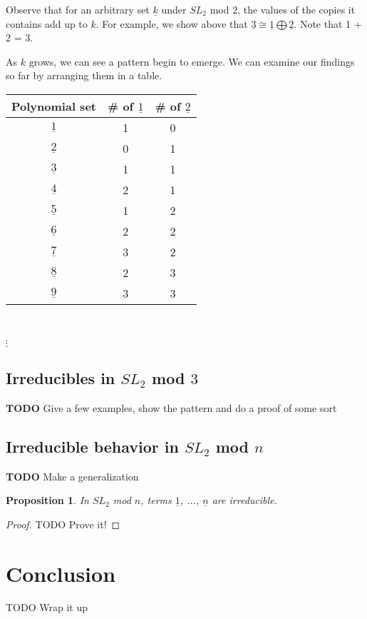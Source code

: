 \documentclass[a4paper,draft]{amsproc}
\theoremstyle{plain}
\newtheorem{prop}{Proposition}[section]
\theoremstyle{definition}
\theoremstyle{remark}
\numberwithin{equation}{section}
\begin{document}
Observe that for an arbitrary set $\underline{k}$ under $SL_{2}$ mod $2$, the values of the copies it contains add up to $k$. For example, we show above that $\underline{3} \cong \underline{1} \bigoplus \underline{2}$. Note that 1 + 2 = 3. 

As $k$ grows, we can see a pattern begin to emerge. We can examine our findings so far by arranging them in a table. 

\begin{table}
    \begin{tabular}{|c|c|c|} 
	\hline
    Polynomial set & \# of $\underline{1}$ & \# of $\underline{2}$ \\ \hline
    $\underline{1}$ & 1 & 0 \\ \hline
    $\underline{2}$ & 0 & 1 \\ \hline
    $\underline{3}$ & 1 & 1 \\ \hline
    $\underline{4}$ & 2 & 1 \\ \hline
    $\underline{5}$ & 1 & 2 \\ \hline
    $\underline{6}$ & 2 & 2 \\ \hline
    $\underline{7}$ & 3 & 2 \\ \hline
    $\underline{8}$ & 2 & 3 \\ \hline
    $\underline{9}$ & 3 & 3 \\ \hline
    \end{tabular} \\
\begin{centering}$\vdots$\end{centering}
\end{table}

\subsection{Irreducibles in $SL_{2}$ mod $3$}
\textbf{TODO} Give a few examples, show the pattern and do a proof of some sort

\subsection{Irreducible behavior in $SL_{2}$ mod $n$}
\textbf{TODO} Make a generalization
\begin{prop}
 In $SL_{2}$ mod $n$, terms $\underline{1}$, ..., $\underline{n}$ are irreducible. 
\end{prop}
\begin{proof}
{TODO} Prove it!
\end{proof}

\section{Conclusion}
{TODO} Wrap it up

\end{document}
